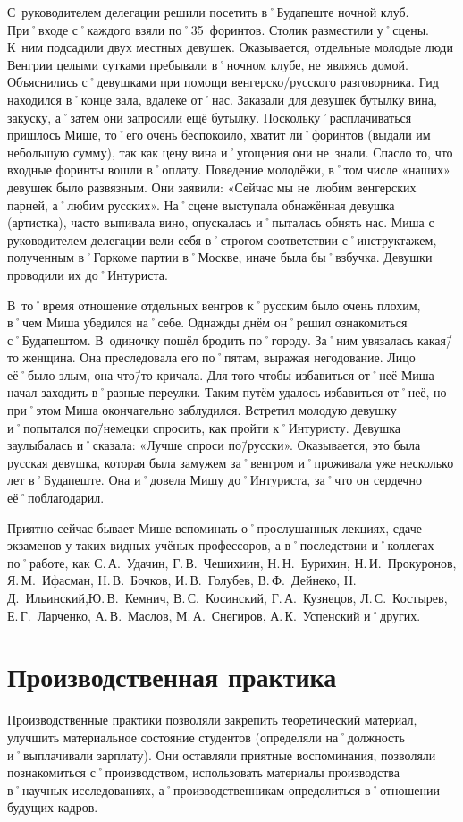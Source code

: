 С~руководителем делегации решили посетить в˚Будапеште ночной клуб. При˚входе с˚каждого взяли по˚35~форинтов. Столик разместили у˚сцены. К~ним подсадили двух местных девушек. Оказывается, отдельные молодые люди Венгрии целыми сутками пребывали в˚ночном клубе, не~являясь домой. Объяснились с˚девушками при помощи венгерско\-/русского разговорника. Гид находился в˚конце зала, вдалеке от˚нас. Заказали для девушек бутылку вина, закуску, а˚затем они запросили ещё бутылку. Поскольку˚расплачиваться пришлось Мише, то˚его очень беспокоило, хватит ли˚форинтов (выдали им небольшую сумму), так как цену вина и˚угощения они не~знали. Спасло то, что входные форинты вошли в˚оплату. Поведение молодёжи, в˚том числе «наших» девушек было развязным. Они заявили: «Сейчас мы не~любим венгерских парней, а˚любим русских». На˚сцене выступала обнажённая девушка (артистка), часто выпивала вино, опускалась и˚пыталась обнять нас. Миша с руководителем делегации вели себя в˚строгом соответствии с˚инструктажем, полученным в˚Горкоме партии в˚Москве, иначе была бы˚взбучка. Девушки проводили их до˚Интуриста. 

В~то˚время отношение отдельных венгров к˚русским было очень плохим, в˚чем Миша убедился на˚себе.
Однажды днём он˚решил ознакомиться с˚Будапештом. В~одиночку пошёл бродить по˚городу. За˚ним увязалась какая\=/то женщина. Она преследовала его по˚пятам, выражая негодование. Лицо её˚было злым, она что\=/то кричала. Для того чтобы избавиться от˚неё Миша начал заходить в˚разные переулки. Таким путём удалось избавиться от˚неё, но при˚этом Миша окончательно заблудился. Встретил молодую девушку и˚попытался по\=/немецки спросить, как пройти к˚Интуристу. Девушка заулыбалась и˚сказала: «Лучше спроси по\=/русски». Оказывается, это была русская девушка, которая была замужем за˚венгром и˚проживала уже несколько лет в˚Будапеште. Она и˚довела Мишу до˚Интуриста, за˚что он сердечно её˚поблагодарил. 

Приятно сейчас бывает Мише вспоминать о˚прослушанных лекциях, сдаче экзаменов у таких видных учёных профессоров, а в˚последствии и˚коллегах по˚работе, как С.\,А.~Удачин, Г.\,В.~Чешихиин, Н.\,Н.~Бурихин, Н.\,И.~Прокуронов, Я.\,М.~Ифасман, Н.\,В.~Бочков, И.\,В.~Голубев, В.\,Ф.~Дейнеко, Н.\,Д.~Ильинский,Ю.\,В.~Кемнич, В.\,С.~Косинский, Г.\,А.~Кузнецов, Л.\,С.~Костырев, Е.\,Г.~Ларченко, А.\,В.~Маслов, М.\,А.~Снегиров, А.\,К.~Успенский и˚других.




\section*{Производственная практика}
\label{sec:productionPractices}
Производственные практики позволяли закрепить теоретический материал, улучшить материальное состояние студентов (определяли на˚должность и˚выплачивали зарплату). Они оставляли приятные воспоминания, позволяли познакомиться с˚производством, использовать материалы производства в˚научных исследованиях, а˚производственникам определиться в˚отношении будущих кадров.

